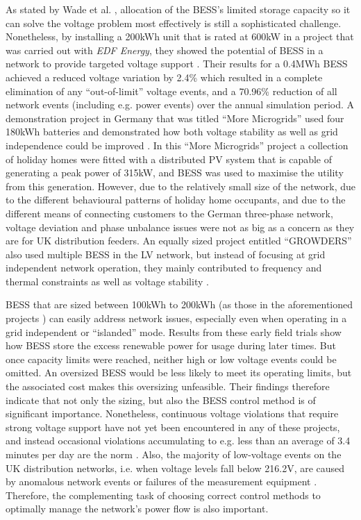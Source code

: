 As stated by Wade et al. \cite{Wade2009}, allocation of the BESS's limited storage capacity so it can solve the voltage problem most effectively is still a sophisticated challenge.
Nonetheless, by installing a 200kWh unit that is rated at 600kW in a project that was carried out with \textit{EDF Energy}, they showed the potential of BESS in a network to provide targeted voltage support \cite{Wade2010}.
Their results for a 0.4MWh BESS achieved a reduced voltage variation by 2.4\% which resulted in a complete elimination of any ``out-of-limit'' voltage events, and a 70.96\% reduction of all network events (including e.g. power events) over the annual simulation period.
A demonstration project in Germany that was titled ``More Microgrids'' used four 180kWh batteries and demonstrated how both voltage stability as well as grid independence could be improved \cite{Overbeeke2010}.
In this ``More Microgrids'' project a collection of holiday homes were fitted with a distributed PV system that is capable of generating a peak power of 315kW, and BESS was used to maximise the utility from this generation.
However, due to the relatively small size of the network, due to the different behavioural patterns of holiday home occupants, and due to the different means of connecting customers to the German three-phase network, voltage deviation and phase unbalance issues were not as big as a concern as they are for UK distribution feeders.
An equally sized project entitled ``GROWDERS'' also used multiple BESS in the LV network, but instead of focusing at grid independent network operation, they mainly contributed to frequency and thermal constraints as well as voltage stability \cite{GROWDERS2011}.

BESS that are sized between 100kWh to 200kWh (as those in the aforementioned projects \cite{Wade2010, Wade2009, Overbeeke2010, GROWDERS2011}) can easily address network issues, especially even when operating in a grid independent or ``islanded'' mode.
Results from these early field trials show how BESS store the excess renewable power for usage during later times.
But once capacity limits were reached, neither high or low voltage events could be omitted.
An oversized BESS would be less likely to meet its operating limits, but the associated cost makes this oversizing unfeasible.
Their findings therefore indicate that not only the sizing, but also the BESS control method is of significant importance.
Nonetheless, continuous voltage violations that require strong voltage support have not yet been encountered in any of these projects, and instead occasional violations accumulating to e.g. less than an average of 3.4 minutes per day are the norm \cite{Sugihara2013}.
Also, the majority of low-voltage events on the UK distribution networks, i.e. when voltage levels fall below 216.2V, are caused by anomalous network events or failures of the measurement equipment \cite{UKPowerNetworks2014a}.
Therefore, the complementing task of choosing correct control methods to optimally manage the network's power flow is also important.

